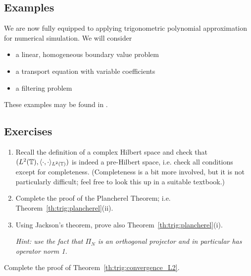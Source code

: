 \subsection{Examples}
%
We are now fully equipped to applying trigonometric polynomial approximation for
numerical simulation. We will consider
\begin{itemize}
  \item a linear, homogeneous boundary value problem
  \item a transport equation with variable coefficients
  \item a filtering problem
\end{itemize}
These examples may be found in \nbtrig.




\subsection{Exercises}

\begin{exercise} \label{exr:trig:hilbert-onb}
  \begin{enumerate} \ilist
    \item Recall the definition of a complex Hilbert space and
        check that $( L^2(\mathbb{T}), \langle \cdot, \cdot \rangle_{L^2(\mathbb{T})} )$ is indeed
        a pre-Hilbert space, i.e. check all conditions except for completeness.
        (Completeness is a bit more involved, but it is not particularly
        difficult; feel free to look this up  in a suitable textbook.)

    \item Complete the proof of the Plancherel Theorem; i.e.
      Theorem~\ref{th:trig:plancherel}(ii).

    \item Using Jackson's theorem, prove also
    Theorem~\ref{th:trig:plancherel}(i).

    {\it Hint: use the fact that $\Pi_N$ is an orthogonal projector and
    in particular has operator norm 1.}
  \end{enumerate}
\end{exercise}

\begin{exercise} \label{exr:trig:convergence_L2}
  Complete the proof of Theorem~\ref{th:trig:convergence_L2}.
\end{exercise}

